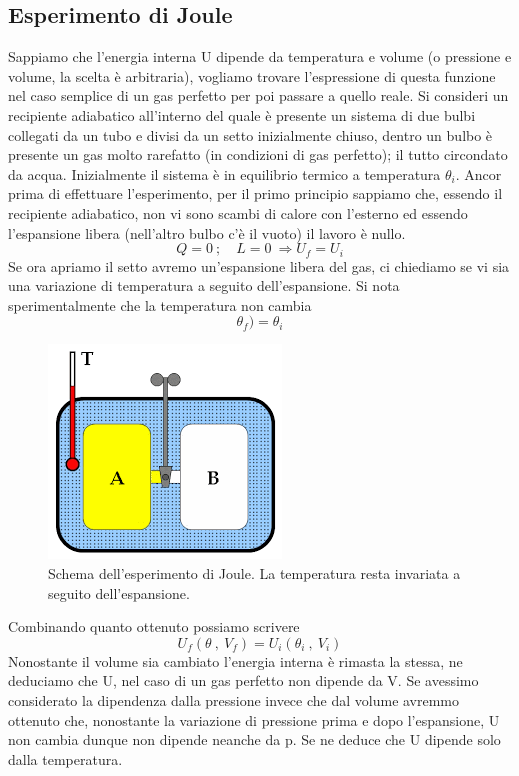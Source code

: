 \documentclass[10pt,a4paper]{article}
\begin{document}
\subsection{Esperimento di Joule}
Sappiamo che l'energia interna U dipende da temperatura e volume (o pressione e volume, la scelta è arbitraria), vogliamo trovare l'espressione di questa funzione nel caso semplice di un gas perfetto per poi passare a quello reale. Si consideri un recipiente adiabatico all'interno del quale è presente un sistema di due bulbi collegati da un tubo e divisi da un setto inizialmente chiuso, dentro un bulbo è presente un gas molto rarefatto (in condizioni di gas perfetto); il tutto circondato da acqua. Inizialmente il sistema è in equilibrio termico a temperatura $\theta_i$.
Ancor prima di effettuare l'esperimento, per il primo principio sappiamo che, essendo il recipiente adiabatico, non vi sono scambi di calore con l'esterno ed essendo l'espansione libera (nell'altro bulbo c'è il vuoto) il lavoro è nullo. 
\[Q = 0\ ; \quad L = 0\ \Rightarrow U_f = U_i\]
Se ora apriamo il setto avremo un'espansione libera del gas, ci chiediamo se vi sia una variazione di temperatura a seguito dell'espansione. Si nota sperimentalmente che la temperatura non cambia
\[\theta_f )= \theta_i\]
\begin{figure}[h!]
	\centering
	\includegraphics[width=0.5\linewidth]{../images/esperimento_Joule}
	\caption{Schema dell'esperimento di Joule. La temperatura resta invariata a seguito dell'espansione.}
	\label{fig:esperimentojoule}
\end{figure}
\FloatBarrier
Combinando quanto ottenuto possiamo scrivere
\[U_f(\theta\ ,\ V_f) = U_i(\theta_i\ ,\ V_i)\]
Nonostante il volume sia cambiato l'energia interna è rimasta la stessa, ne deduciamo che U, nel caso di un gas perfetto non dipende da V. Se avessimo considerato la dipendenza dalla pressione invece che dal volume avremmo ottenuto che, nonostante la variazione di pressione prima e dopo l'espansione, U non cambia dunque non dipende neanche da p. Se ne deduce che U dipende solo dalla temperatura.\\
\end{document}
